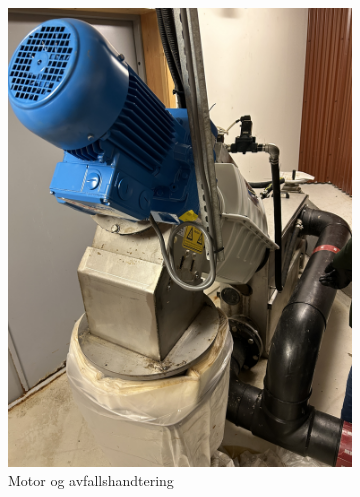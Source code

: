 \begin{figure}[htbp]
    \centering
    \begin{subfigure}[b]{0.3\textwidth}
        \centering
        \includegraphics[angle=-90,width=1\textwidth]{Bilder/Huber.JPG}
        \caption{Motor og avfallshandtering}\label{fig:Huber}
    \end{subfigure}
    \hfill
    \begin{subfigure}[b]{0.3\textwidth}
        \centering

\end{subfigure}
\end{figure}
